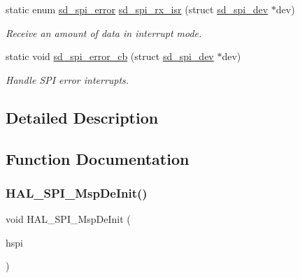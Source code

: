 \begin{DoxyCompactItemize}
static enum \mbox{\hyperlink{group___s_d___s_p_i___types_ga9ae67f7089a8196e9c6b74b8a6708c2e}{sd\+\_\+spi\+\_\+error}} \mbox{\hyperlink{group___s_d___s_p_i___functions_ga8f8403c9f68c9a623486a29cf8715fda}{sd\+\_\+spi\+\_\+rx\+\_\+isr}} (struct \mbox{\hyperlink{structsd__spi__dev}{sd\+\_\+spi\+\_\+dev}} $\ast$dev)
\begin{DoxyCompactList}\small\item\em Receive an amount of data in interrupt mode. \end{DoxyCompactList}\item 
static void \mbox{\hyperlink{group___s_d___s_p_i___functions_ga3515d67aa70e65e562b55011aface3b9}{sd\+\_\+spi\+\_\+error\+\_\+cb}} (struct \mbox{\hyperlink{structsd__spi__dev}{sd\+\_\+spi\+\_\+dev}} $\ast$dev)
\begin{DoxyCompactList}\small\item\em Handle S\+PI error interrupts. \end{DoxyCompactList}\end{DoxyCompactItemize}


\subsection{Detailed Description}


\subsection{Function Documentation}
\mbox{\label{group___s_d___s_p_i___functions_gabadc4d4974af1afd943e8d13589068e1}} 
\subsubsection{\texorpdfstring{H\+A\+L\+\_\+\+S\+P\+I\+\_\+\+Msp\+De\+Init()}{HAL\_SPI\_MspDeInit()}}
{\footnotesize\ttfamily void H\+A\+L\+\_\+\+S\+P\+I\+\_\+\+Msp\+De\+Init (\begin{DoxyParamCaption}\item[{S\+P\+I\+\_\+\+Handle\+Type\+Def $\ast$}]{hspi }\end{DoxyParamCaption})}



